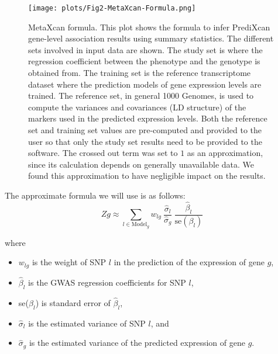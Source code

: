 \documentclass[10pt]{article}
\begin{document}

\begin{figure}
\begin{center}
\texttt{[image: plots/Fig2-MetaXcan-Formula.png]}
\caption{MetaXcan formula. This plot shows the formula to infer PrediXcan gene-level association results using summary statistics. The different sets involved in input data are shown. The study set is where the regression coefficient between the phenotype and the genotype is obtained from. The training set is the reference transcriptome dataset where the prediction models of gene expression levels are trained. The reference set, in general 1000 Genomes, is used to compute the variances and covariances (LD structure) of the markers used in the predicted expression levels. Both the reference set and training set values are pre-computed and provided to the user so that only the study set results need to be provided to the software. The crossed out term was set to $1$ as an approximation, since its calculation depends on generally unavailable data. We found this approximation to have negligible impact on the results.} %
\label{fig:metaxcan-formula}
\end{center}
\end{figure}

The approximate formula we will use is as follows:
\begin{equation}
Zg \approx \sum_{l\in \text{Model}_g} w_{lg} ~\frac{\hat\sigma_l}{\hat\sigma_g} ~  \frac{\hat\beta_l}{\text{se}(\beta_l)} 
\end{equation}

where

\begin{itemize}
\item $w_{lg}$ is the weight of SNP $l$ in the prediction of the expression of gene $g$,
\item $\hat\beta_l$ is the GWAS regression coefficients for SNP $l$,
\item se($\beta_l$) is standard error of $\hat\beta_l$,
\item $\hat\sigma_l$ is the estimated variance of SNP $l$, and
\item $\hat\sigma_g$ is the estimated variance of the predicted expression of gene $g$.
\end{itemize}
\end{document}
